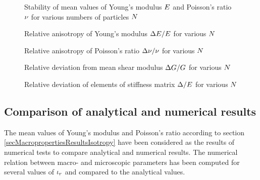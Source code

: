 \begin{figure}
	\centering
	\caption[Stability of mean values of $\youngModulus$ and $\poissonRatio$]{Stability of mean values of Young's modulus $\youngModulus$ and Poisson's ratio $\poissonRatio$ for various numbers of particles $N$}
	\label{figMacroPropertiesElasticResultsStabilityAvg}
\end{figure}

\begin{figure}
	\centering
	\caption{Relative anisotropy of Young's modulus $\Delta E/E$ for various $N$}
	\label{figMacroPropertiesElasticResultsRelativeAnizotropyYoung}
\end{figure}

\begin{figure}
	\centering
	\caption{Relative anisotropy of Poisson's ratio $\Delta\nu/\nu$ for various $N$}
	\label{figMacroPropertiesElasticResultsRelativeAnizotropyPoisson}
\end{figure}

\begin{figure}
	\centering
	\caption{Relative deviation from mean shear modulus $\Delta G/G$ for various $N$}
	\label{figMacroPropertiesElasticResultsRelativeAnizotropyShear}
\end{figure}

\begin{figure}
	\centering
	\caption{Relative deviation of  elements of stiffness matrix $\Delta/E$ for various $N$}
	\label{figMacroPropertiesElasticResultsRelativeAnizotropyZero}
\end{figure}




\subsection{Comparison of analytical and numerical results}
The mean values of Young's modulus and Poisson's ratio according to section \ref{secMacropropertiesResultsIsotropy} have been considered as the results of numerical tests to compare analytical and numerical results.
The numerical relation between macro- and microscopic parameters has been computed for several values of $\iota_r$ and compared to the analytical values.


